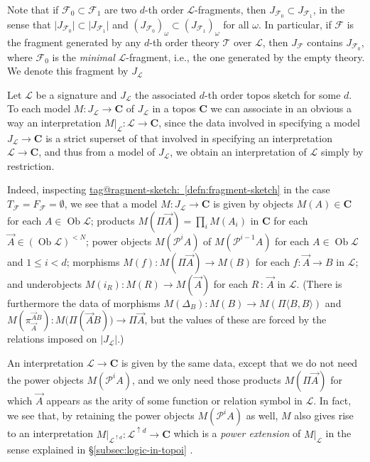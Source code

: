 \documentclass{amsart}
\makeatletter
\newcommand\abs[2][]{#1\lvert{#2}#1\rvert}
\newcommand\bC{\mathbf{C}}
\newcommand\br[1]{\langle{}#1\rangle{}}
\newcommand\cF{\mathcal{F}}
\newcommand\cL{\mathcal{L}}
\newcommand\cT{\mathcal{T}}
\newcommand\Ob{\operatorname{Ob}}
\newcommand\pbig[1]{\big({#1}\big)}
\newcommand\pow{\mathcal{P}}
\newcommand\rstr[2]{{\left.#1\right|_{#2}}}
\newcommand\tolon{{\,:\,}}
\newcommand\up{\uparrow}
\newcommand\vA{\vek{A}}
\newcommand\vek[1]{{\vec{#1}}}
\newcommand\tagword[1]{\csname tag@#1\endcsname}
\def\label@tag#1:#2\@nil{#1}
\newcommand\labeltag[1]{\label@tag#1:\@nil}
\newcommand\jref[1]{%
  \texorpdfstring%
    {\hyperref[#1]{\tagword{\labeltag{#1}}~\ref*{#1}}}%
    {\tagword{\labeltag{#1}}~\ref*{#1}}%
}
\newcommand\prerefpost[3]{%
  \texorpdfstring%
    {\hyperref[#2]{#1\ref*{#2}#3}}%
    {#1\ref*{#2}#3}%
}
\newcommand\sref[1]{\prerefpost{\S}{#1}{}}
\theoremstyle{definition}
\theoremstyle{remark}
\theoremstyle{plainwithref}
\makeatother
\begin{document}
Note that if \( \cF_0 \subset \cF_1 \) are two \( d \)-th order \( \cL \)-fragments, then \( J_{\cF_0} \subset J_{\cF_1} \), in the sense that \( \abs{J_{\cF_0}} \subset \abs{J_{\cF_1}} \) and \( (J_{\cF_0})_\omega \subset (J_{\cF_1})_\omega \) for all \( \omega \).
In particular, if \( \cF \) is the fragment generated by any \( d \)-th order theory \( \cT \) over \( \cL \), then \( J_{\cF} \) contains \( J_{\cF_0} \), where \( \cF_0 \) is the \emph{minimal} \( \cL \)-fragment, i.e., the one generated by the empty theory.
We denote this fragment by \( J_\cL \)

\begin{defn}
  Let \( \cL \) be a signature and \( J_\cL \) the associated \( d \)-th order topos sketch for some \( d \).
  To each model \( M \colon J_\cL \to \bC \) of \( J_\cL \) in a topos \( \bC \) we can associate in an obvious a way an interpretation \( \rstr{M}{\cL} \colon \cL \to \bC \), since the data involved in specifying a model \( J_\cL \to \bC \) is a strict superset of that involved in specifying an interpretation \( \cL \to \bC \), and thus from a model of \( J_\cL \), we obtain an interpretation of \( \cL \) simply by restriction.

  Indeed, inspecting \jref{defn:fragment-sketch} in the case \( T_\cF = F_\cF = \emptyset \), we see that a model \( M \colon J_\cL \to \bC \) is given by objects \( M(A) \in \bC \) for each \( A \in \Ob \cL \); products \( M(\Pi \vA) = \prod_i M(A_i) \) in \( \bC \) for each \( \vA \in (\Ob \cL)^{< N} \); power objects \( M(\pow^{i} A) \) of \( M(\pow^{i-1} A) \) for each \( A \in \Ob \cL \) and \( 1 \le i < d \); morphisms \( M(f) \colon M(\Pi \vA) \to M(B) \) for each \( f \colon \vA \to B \) in \( \cL \); and underobjects \( M(i_R) \colon M(R) \to M(\vA) \) for each \( R \tolon \vA \) in \( \cL \).
  (There is furthermore the data of morphisms \( M(\Delta_B) \colon M(B) \to M(\Pi\br{B,B}) \) and \( M(\pi_{\vA}^{\vA B}) \colon M\pbig{\Pi(\vA B)} \to \Pi \vA \), but the values of these are forced by the relations imposed on \( \abs{J_\cL} \).)

  An interpretation \( \cL \to \bC \) is given by the same data, except that we do not need the power objects \( M(\pow^{i} A) \), and we only need those products \( M(\Pi \vA) \) for which \( \vA \) appears as the arity of some function or relation symbol in \( \cL \).
  In fact, we see that, by retaining the power objects \( M(\pow^{i} A) \) as well, \( M \) also gives rise to an interpretation \( \rstr{M}{\cL^{\up d}} \colon \cL^{\up d} \to \bC \) which is a \emph{power extension} of \( \rstr{M}{\cL} \) in the sense explained in \sref{subsec:logic-in-topoi}.


\end{defn}
\end{document}
